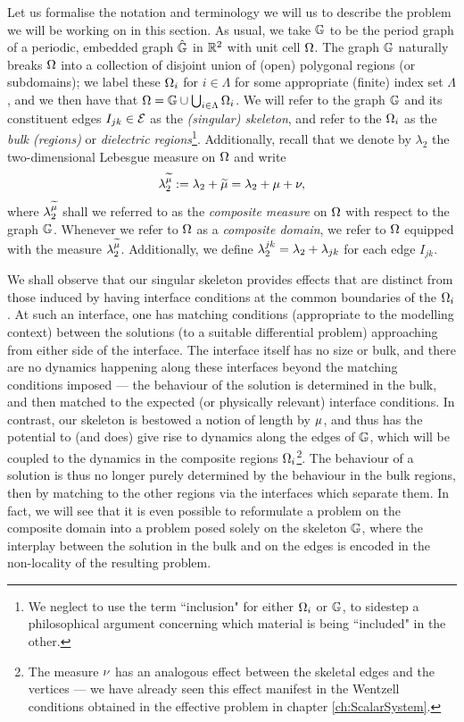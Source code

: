 Let us formalise the notation and terminology we will us to describe the problem we will be working on in this section.
As usual, we take $\mathbb{G}$ to be the period graph of a periodic, embedded graph $\hat{\mathbb{G}}$ in $\mathbb{R}^2$ with unit cell $\Omega$.
The graph $\mathbb{G}$ naturally breaks $\Omega$ into a collection of disjoint union of (open) polygonal regions (or subdomains); we label these $\Omega_i$ for $i\in\Lambda$ for some appropriate (finite) index set $\Lambda$, and we then have that $\Omega = \mathbb{G}\cup\bigcup_{i\in\Lambda}\Omega_i$.
We will refer to the graph $\mathbb{G}$ and its constituent edges $I_{jk}\in\mathcal{E}$ as the \emph{(singular) skeleton}, and refer to the $\Omega_i$ as the \emph{bulk (regions)} or \emph{dielectric regions}\footnote{We neglect to use the term ``inclusion" for either $\Omega_i$ or $\mathbb{G}$, to sidestep a philosophical argument concerning which material is being ``included" in the other.}.
Additionally, recall that we denote by $\lambda_2$ the two-dimensional Lebesgue measure on $\Omega$ and write
\begin{align*}
	\lambda_2^{\widetilde{\mu}} := \lambda_2 + \widetilde{\mu} = \lambda_2 + \mu + \nu,
\end{align*}
where $\lambda_2^{\widetilde{\mu}}$ shall we referred to as the \emph{composite measure} on $\Omega$ with respect to the graph $\mathbb{G}$.
Whenever we refer to $\Omega$ as a \emph{composite domain}, we refer to $\Omega$ equipped with the measure $\lambda_2^{\widetilde{\mu}}$.
Additionally, we define $\lambda_2^{jk} = \lambda_2 + \lambda_{jk}$ for each edge $I_{jk}$.

We shall observe that our singular skeleton provides effects that are distinct from those induced by having interface conditions at the common boundaries of the $\Omega_i$.
At such an interface, one has matching conditions (appropriate to the modelling context) between the solutions (to a suitable differential problem) approaching from either side of the interface.
The interface itself has no size or bulk, and there are no dynamics happening along these interfaces beyond the matching conditions imposed --- the behaviour of the solution is determined in the bulk, and then matched to the expected (or physically relevant) interface conditions.
In contrast, our skeleton is bestowed a notion of length by $\mu$, and thus has the potential to (and does) give rise to dynamics along the edges of $\mathbb{G}$, which will be coupled to the dynamics in the composite regions $\Omega_i$\footnote{The measure $\nu$ has an analogous effect between the skeletal edges and the vertices --- we have already seen this effect manifest in the Wentzell conditions obtained in the effective problem in chapter \ref{ch:ScalarSystem}.}.
The behaviour of a solution is thus no longer purely determined by the behaviour in the bulk regions, then by matching to the other regions via the interfaces which separate them.
In fact, we will see that it is even possible to reformulate a problem on the composite domain into a problem posed solely on the skeleton $\mathbb{G}$, where the interplay between the solution in the bulk and on the edges is encoded in the non-locality of the resulting problem.

